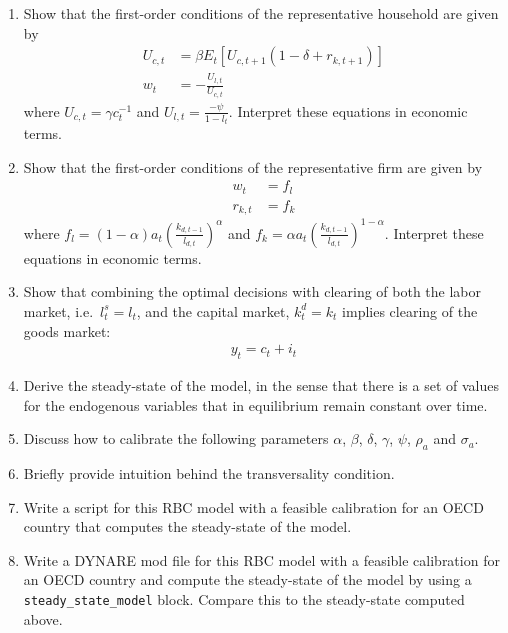 \begin{enumerate}
\item Show that the first-order conditions of the representative household are given by
\begin{align*}
U_{c,t} &= \beta E_t\left[U_{c,t+1} \left(1-\delta + r_{k,t+1}\right)\right]
\\
w_t &= -\frac{U_{l,t}}{U_{c,t}}
\end{align*}
where \(U_{c,t} = \gamma c_t^{-1}\) and \(U_{l,t} = \frac{-\psi}{1-l_t}\).
Interpret these equations in economic terms.

\item Show that the first-order conditions of the representative firm are given by
\begin{align*}
w_t &= f_l
\\
r_{k,t} &= f_k
\end{align*}
where \(f_l = (1-\alpha) a_t {\left(\frac{k_{d,t-1}}{l_{d,t}}\right)}^\alpha \) and \(f_k = \alpha a_t {\left(\frac{k_{d,t-1}}{l_{d,t}}\right)}^{1-\alpha}\).
Interpret these equations in economic terms.

\item Show that combining the optimal decisions with clearing of both the labor market, i.e.\
\(l^s_t = l_t\), and the capital market, \(k^d_t = k_t\) implies clearing of the goods market:
\begin{align*}
y_t = c_t + i_t
\end{align*}  

\item Derive the steady-state of the model, in the sense that there is a set of values for the endogenous variables that in equilibrium remain constant over time.

\item Discuss how to calibrate the following parameters \(\alpha \), \(\beta \), \(\delta \), \(\gamma \), \(\psi \), \(\rho_a\) and \(\sigma_a\).

\item Briefly provide intuition behind the transversality condition.

\item Write a script for this RBC model with a feasible calibration for an OECD country that computes the steady-state of the model.

\item Write a DYNARE mod file for this RBC model with a feasible calibration for an OECD country
  and compute the steady-state of the model by using a \texttt{steady\_state\_model} block.
Compare this to the steady-state computed above.


\end{enumerate}
